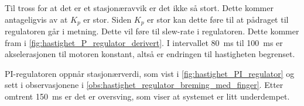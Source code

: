 Til tross for at det er et stasjonæravvik er det ikke så stort. Dette kommer antageligvis av at $K_p$ er stor. Siden $K_p$ er stor kan dette føre til at pådraget til regulatoren går i metning. Dette vil føre til slew-rate i regulatoren. Dette kommer fram i \autoref{fig:hastighet_P_regulator_derivert}. I intervallet \SI{80}{\milli\second} til \SI{100}{\milli\second} er akselerasjonen til motoren konstant, altså er endringen til hastigheten begrenset.

PI-regulatoren oppnår stasjonærverdi, som vist i \autoref{fig:hastighet_PI_regulator} og sett i observasjonene i \ref{obs:hastighet_regulator_breming_med_finger}. Etter omtrent \SI{150}{\milli\second} er det er oversving, som viser at systemet er litt underdempet. 

